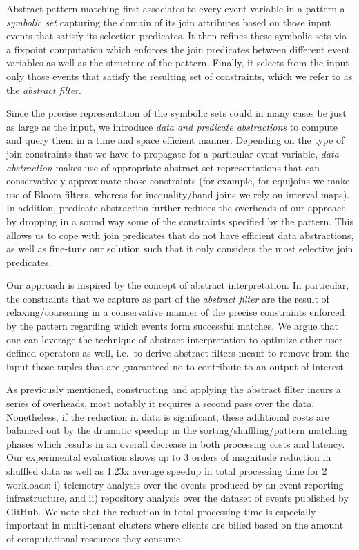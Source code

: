 Abstract pattern matching first associates to every event variable in a pattern 
a {\em symbolic set} capturing the domain of its join attributes based on those 
input events that satisfy its selection predicates.  
It then refines these symbolic sets via a fixpoint computation which enforces 
the join predicates between different event variables as well as the structure 
of the pattern. 
Finally, it selects from the input only those events that satisfy the resulting 
set of constraints, which we refer to as the {\em abstract filter}.  

Since the precise representation of the symbolic sets could in many 
cases be just as large as the input, we introduce {\em data and predicate 
abstractions} to compute and query them in a time and space efficient manner. 
Depending on the type of join constraints that we have to propagate for a 
particular event variable, {\em data abstraction} makes use of appropriate 
abstract set representations that can conservatively approximate those 
constraints (for example, for equijoins we make use of 
Bloom filters\cite{Bloom:1970}, whereas for inequality/band joins we rely on 
interval maps).
In addition, predicate abstraction further reduces the overheads of 
our approach by dropping in a sound way some of the constraints specified by 
the pattern. 
This allows us to cope with join predicates that do not have efficient data 
abstractions, as well as fine-tune our solution such that it only considers the 
most selective join predicates.
      
 
Our approach is inspired by the concept of abstract interpretation.
In particular, the constraints that we capture as part of the {\em abstract 
filter} are the result of relaxing/coarsening in a conservative manner of the 
precise constraints enforced by the pattern regarding which events form 
successful matches. 
We argue that one can leverage the technique of abstract interpretation to 
optimize other user defined operators as well, i.e.\ to derive abstract filters 
meant to remove from the input those tuples that are guaranteed no to 
contribute to an output of interest.


As previously mentioned, constructing and applying the abstract filter incurs a 
series of overheads, most notably it requires a second pass over the data.
Nonetheless, if the reduction in data is significant, these additional costs 
are balanced out by the dramatic speedup in the sorting/shuffling/pattern 
matching phases which results in an overall decrease in both processing costs 
and latency.  
Our experimental evaluation shows up to 3 orders of magnitude reduction in 
shuffled data as well as 1.23x average speedup in total processing time for 2 
workloads:
i) telemetry analysis over the events produced by an event-reporting 
infrastructure, and
ii) repository analysis over the dataset of events published by GitHub.
We note that the reduction in total processing time is especially important in 
multi-tenant clusters where clients are billed based on the amount of 
computational resources they consume.   


